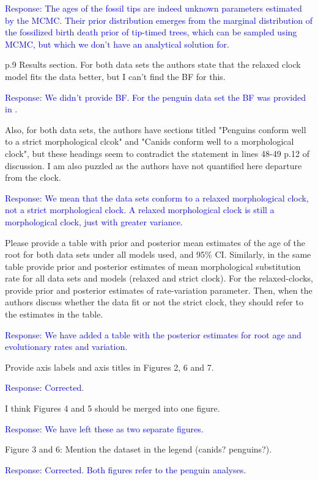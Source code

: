 \documentclass[11pt]{article}
\newcommand{\response}[1]{\medskip{}\textcolor{blue}{{Response: #1}}\medskip{}}
\begin{document}
\response{The ages of the fossil tips are indeed unknown parameters estimated by the MCMC. Their prior distribution emerges from the marginal distribution of the fossilized birth death prior of tip-timed trees, which can be sampled using MCMC, but which we don't have an analytical solution for.}

p.9 Results section. For both data sets the authors state that the relaxed clock model fits the data better, but I can't find the BF for this. 

\response{We didn't provide BF. For the penguin data set the BF was provided in \cite{gavryushkina2015bayesian}.}

Also, for both data sets, the authors have sections titled "Penguins conform well to a strict morphological clcok" and "Canids conform well to a morphological clock", but these headings seem to contradict the statement in lines 48-49 p.12 of discussion. I am also puzzled as the authors have not quantified here departure from the clock. 

\response{We mean that the data sets conform to a relaxed morphological clock, not a strict morphological clock. A relaxed morphological clock is still a morphological clock, just with greater variance.}

Please provide a table with prior and posterior mean estimates of the age of the root for both data sets under all models used, and 95\% CI. Similarly, in the same table provide prior and posterior estimates of mean morphological substitution rate for all data sets and models (relaxed and strict clock). For the relaxed-clocks, provide prior and posterior estimates of rate-variation parameter. Then, when the authors discuss whether the data fit or not the strict clock, they should refer to the estimates in the table.

\response{
We have added a table with the posterior estimates for root age and evolutionary rates and variation.
}


Provide axis labels and axis titles in Figures 2, 6 and 7.

\response{Corrected.}

I think Figures 4 and 5 should be merged into one figure.

\response{We have left these as two separate figures.}

Figure 3 and 6: Mention the dataset in the legend (canids? penguins?).

\response{Corrected. Both figures refer to the penguin analyses.}
\end{document}
